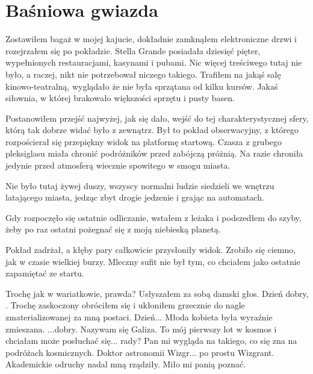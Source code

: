 \chapter{Baśniowa gwiazda} 


Zostawiłem bagaż w mojej kajucie, dokładnie zamknąłem elektroniczne drzwi i rozejrzałem się po pokładzie.
Stella Grande posiadała dziesięć pięter, wypełnionych restauracjami, kasynami i pubami.
Nic więcej treściwego tutaj nie było, a raczej, nikt nie potrzebował niczego takiego.
Trafiłem na jakąś salę kinowo-teatralną, wyglądało że nie była sprzątana od kilku kursów.
Jakaś siłownia, w której brakowało większości sprzętu i pusty basen.

Postanowiłem przejść najwyżej, jak się dało, wejść do tej charakterystycznej sfery, którą tak dobrze widać było z zewnątrz.
Był to pokład obserwacyjny, z którego rozpościerał się przepiękny widok na platformę startową.
Czasza z grubego pleksiglasu miała chronić podróżników przed zabójczą próżnią.
Na razie chroniła jedynie przed atmosferą wiecznie spowitego w smogu miasta.

Nie było tutaj żywej duszy, wszyscy normalni ludzie siedzieli we wnętrzu latającego miasta, jedząc zbyt drogie jedzenie i grając na automatach.

Gdy rozpoczęło się ostatnie odliczanie, wstałem z leżaka i podszedłem do szyby, żeby po raz ostatni pożegnać się z moją niebieską planetą.

Pokład zadrżał, a kłęby pary całkowicie przysłoniły widok.
Zrobiło się ciemno, jak w czasie wielkiej burzy.
Mleczny sufit nie był tym, co chciałem jako ostatnie zapamiętać ze startu.

\begin{dialogue}
	\ds{} Trochę jak w wariatkowie, prawda? \dm{} Usłyszałem za sobą damski głos.
	\ds{} Dzień dobry, . \dm{} Trochę zaskoczony obróciłem się i ukłoniłem grzecznie do nagle zmaterializowanej za mną postaci.
	\ds{} Dzień... \dm{} Młoda kobieta była wyraźnie zmieszana. \dm{} ...dobry. Nazywam się Galiza. To mój pierwszy lot w kosmos i chciałam może posłuchać się... rady?
		Pan mi wygląda na takiego, co się zna na podróżach kosmicznych.
	\ds{} Doktor astronomii Wizgr... po prostu Wizgrant. \dm{} Akademickie odruchy nadal mną rządziły. \dm{} Miło mi panią poznać.
\end{dialogue}

